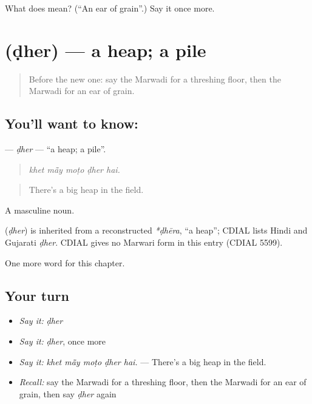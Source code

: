 \begin{tcolorbox}[breakable,colback=teal!4,colframe=teal!35!black,title={Before you move on}]
What does  mean? (\textquotedblleft{}An ear of grain\textquotedblright{}.) Say it once more.
\end{tcolorbox}
\section[\texorpdfstring{\mw{ढेर} (ḍher)}{ढेर (ḍher)}]{ (ḍher) — a heap; a pile}

\label{lesson:MW-C240-dher}



\begin{quote}
Before the new one: say the Marwadi for a threshing floor, then the Marwadi for an ear of grain.
\end{quote}

\subsection*{You'll want to know: }
\textbf{} — \emph{ḍher} — \textquotedblleft{}a heap; a pile\textquotedblright{}.

\begin{quote}
    
\end{quote}

\begin{quote}
\emph{khet mā̃y moṭo ḍher hai.}
\end{quote}

\begin{quote}
There's a big heap in the field.
\end{quote}

A masculine noun.

\begin{cousinweb}
\textbf{} (\emph{ḍher}) is inherited from a reconstructed \emph{*ḍhēra}, \textquotedblleft{}a heap\textquotedblright{}; CDIAL lists Hindi and Gujarati \emph{ḍher}. CDIAL gives no Marwari form in this entry (CDIAL 5599).
\end{cousinweb}

\begin{grammarlens}[title={What you've built}]
One more word for this chapter.
\end{grammarlens}

\subsection*{Your turn}
\begin{itemize}
\raggedright
  \item \emph{Say it:} \emph{ḍher}
  \item \emph{Say it:} \emph{ḍher}, once more
  \item \emph{Say it:} \emph{khet mā̃y moṭo ḍher hai.} — There's a big heap in the field.
  \item \emph{Recall:} say the Marwadi for a threshing floor, then the Marwadi for an ear of grain, then say \emph{ḍher} again
\end{itemize}

